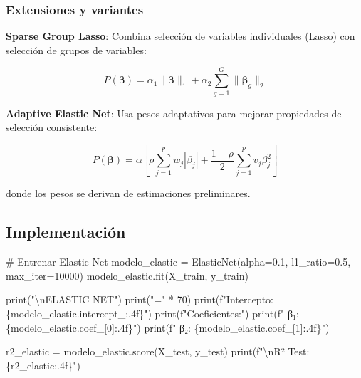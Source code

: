 \documentclass[
  doc,
  floatsintext,
  longtable,
  a4paper,
  nolmodern,
  notxfonts,
  notimes,
  12pt,
  colorlinks=true,linkcolor=blue,citecolor=blue,urlcolor=blue]{apa7}
\newenvironment{Shaded}{\begin{snugshade}}{\end{snugshade}}
\newcommand{\BuiltInTok}[1]{\textcolor[rgb]{0.00,0.23,0.31}{#1}}
\newcommand{\CharTok}[1]{\textcolor[rgb]{0.13,0.47,0.30}{#1}}
\newcommand{\CommentTok}[1]{\textcolor[rgb]{0.37,0.37,0.37}{#1}}
\newcommand{\DecValTok}[1]{\textcolor[rgb]{0.68,0.00,0.00}{#1}}
\newcommand{\FloatTok}[1]{\textcolor[rgb]{0.68,0.00,0.00}{#1}}
\newcommand{\NormalTok}[1]{\textcolor[rgb]{0.00,0.23,0.31}{#1}}
\newcommand{\OperatorTok}[1]{\textcolor[rgb]{0.37,0.37,0.37}{#1}}
\newcommand{\SpecialCharTok}[1]{\textcolor[rgb]{0.37,0.37,0.37}{#1}}
\newcommand{\SpecialStringTok}[1]{\textcolor[rgb]{0.13,0.47,0.30}{#1}}
\newcommand{\StringTok}[1]{\textcolor[rgb]{0.13,0.47,0.30}{#1}}
\begin{document}
\subsubsection{Extensiones y variantes}\label{extensiones-y-variantes}

\textbf{Sparse Group Lasso}: Combina selección de variables individuales
(Lasso) con selección de grupos de variables:

\[
P(\boldsymbol{\beta}) = \alpha_1 \|\boldsymbol{\beta}\|_1 + \alpha_2 \sum_{g=1}^{G} \|\boldsymbol{\beta}_g\|_2
\]

\textbf{Adaptive Elastic Net}: Usa pesos adaptativos para mejorar
propiedades de selección consistente:

\[
P(\boldsymbol{\beta}) = \alpha \left[ \rho \sum_{j=1}^{p} w_j|\beta_j| + \frac{1-\rho}{2} \sum_{j=1}^{p} v_j\beta_j^2 \right]
\]

donde los pesos se derivan de estimaciones preliminares.

\subsection{Implementación}\label{implementaciuxf3n-3}

\begin{Shaded}
\begin{Highlighting}[]
\CommentTok{\# Entrenar Elastic Net}
\NormalTok{modelo\_elastic }\OperatorTok{=}\NormalTok{ ElasticNet(alpha}\OperatorTok{=}\FloatTok{0.1}\NormalTok{, l1\_ratio}\OperatorTok{=}\FloatTok{0.5}\NormalTok{, max\_iter}\OperatorTok{=}\DecValTok{10000}\NormalTok{)}
\NormalTok{modelo\_elastic.fit(X\_train, y\_train)}

\BuiltInTok{print}\NormalTok{(}\StringTok{"}\CharTok{\textbackslash{}n}\StringTok{ELASTIC NET"}\NormalTok{)}
\BuiltInTok{print}\NormalTok{(}\StringTok{"="} \OperatorTok{*} \DecValTok{70}\NormalTok{)}
\BuiltInTok{print}\NormalTok{(}\SpecialStringTok{f"Intercepto: }\SpecialCharTok{\{}\NormalTok{modelo\_elastic}\SpecialCharTok{.}\NormalTok{intercept\_}\SpecialCharTok{:.4f\}}\SpecialStringTok{"}\NormalTok{)}
\BuiltInTok{print}\NormalTok{(}\SpecialStringTok{f"Coeficientes:"}\NormalTok{)}
\BuiltInTok{print}\NormalTok{(}\SpecialStringTok{f"  β₁: }\SpecialCharTok{\{}\NormalTok{modelo\_elastic}\SpecialCharTok{.}\NormalTok{coef\_[}\DecValTok{0}\NormalTok{]}\SpecialCharTok{:.4f\}}\SpecialStringTok{"}\NormalTok{)}
\BuiltInTok{print}\NormalTok{(}\SpecialStringTok{f"  β₂: }\SpecialCharTok{\{}\NormalTok{modelo\_elastic}\SpecialCharTok{.}\NormalTok{coef\_[}\DecValTok{1}\NormalTok{]}\SpecialCharTok{:.4f\}}\SpecialStringTok{"}\NormalTok{)}

\NormalTok{r2\_elastic }\OperatorTok{=}\NormalTok{ modelo\_elastic.score(X\_test, y\_test)}
\BuiltInTok{print}\NormalTok{(}\SpecialStringTok{f"}\CharTok{\textbackslash{}n}\SpecialStringTok{R² Test: }\SpecialCharTok{\{}\NormalTok{r2\_elastic}\SpecialCharTok{:.4f\}}\SpecialStringTok{"}\NormalTok{)}
\end{Highlighting}
\end{Shaded}
\end{document}
